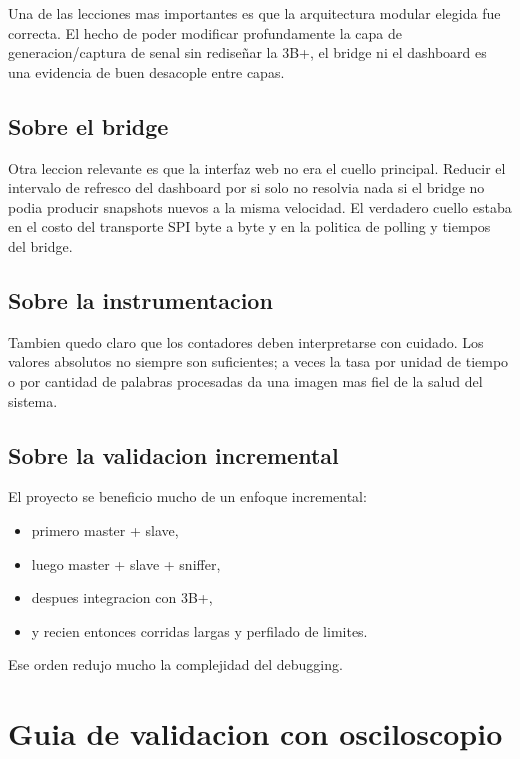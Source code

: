 \documentclass[12pt,a4paper,oneside]{report}
\begin{document}
Una de las lecciones mas importantes es que la arquitectura modular elegida fue correcta. El hecho de poder modificar profundamente la capa de generacion/captura de senal sin rediseñar la 3B+, el bridge ni el dashboard es una evidencia de buen desacople entre capas.

\section{Sobre el bridge}

Otra leccion relevante es que la interfaz web no era el cuello principal. Reducir el intervalo de refresco del dashboard por si solo no resolvia nada si el bridge no podia producir snapshots nuevos a la misma velocidad. El verdadero cuello estaba en el costo del transporte SPI byte a byte y en la politica de polling y tiempos del bridge.

\section{Sobre la instrumentacion}

Tambien quedo claro que los contadores deben interpretarse con cuidado. Los valores absolutos no siempre son suficientes; a veces la tasa por unidad de tiempo o por cantidad de palabras procesadas da una imagen mas fiel de la salud del sistema.

\section{Sobre la validacion incremental}

El proyecto se beneficio mucho de un enfoque incremental:

\begin{itemize}[leftmargin=1.2cm]
    \item primero master + slave,
    \item luego master + slave + sniffer,
    \item despues integracion con 3B+,
    \item y recien entonces corridas largas y perfilado de limites.
\end{itemize}

Ese orden redujo mucho la complejidad del debugging.

\chapter{Guia de validacion con osciloscopio}
\end{document}
